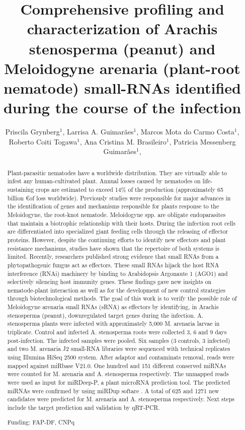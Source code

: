 \documentclass[twoside]{article}
\title{\vspace{-15mm}\fontsize{24pt}{10pt}\selectfont\textbf{ Comprehensive profiling and characterization of  Arachis stenosperma (peanut) and Meloidogyne arenaria (plant-root nematode) small-RNAs identified during the course of the infection }} %
\author{ Priscila Grynberg$^{1}$, Larrisa A. Guimarães$^{1}$, Marcos Mota do Carmo Costa$^{1}$, Roberto Coiti Togawa$^{1}$, Ana Cristina M. Brasileiro$^{1}$, Patricia Messenberg Guimarães$^{1}$, }
\affil{ 1 Embrapa Recursos Genéticos e Biotecnologia

 }
\date{}
\begin{document}
  
  
  \maketitle %
  
  
  \thispagestyle{fancy} %
  
  
  \begin{abstract}
  Plant-parasitic nematodes have a worldwide distribution. They are virtually able to infest any human-cultivated plant. Annual losses caused by nematodes on life-sustaining crops are estimated to exceed 14\% of the production (approximately 65 billion \euro of loss worldwide). Previously studies were responsible for major advances in the identification of genes and mechanisms responsible for plants response to the Meloidogyne, the root-knot nematode. Meloidogyne spp. are obligate endoparasites that maintain a biotrophic relationship with their hosts. During the infection root cells are differentiated into specialized giant feeding cells through the releasing of effector proteins. However, despite the continuing efforts to identify new effectors and plant resistance mechanisms, studies have shown that the repertoire of both systems is limited. Recently, researchers published strong evidence that small RNAs from a phytopathogenic fungus act as effectors. These small RNAs hijack the host RNA interference (RNAi) machinery by binding to Arabidopsis Argonaute 1 (AGO1) and selectively silencing host immunity genes. These findings gave new insights on nematode-plant interaction as well as for the development of new control strategies through biotechnological methods. The goal of this work is to verify the possible role of Meloidogyne arenaria small RNAs (sRNA) as effectors by identifying, in Arachis stenosperma (peanut), downregulated target genes during the infection. A. stenosperma plants were infected with approximately 5,000 M. arenaria larvae in triplicate. Control and infected A. stenosperma roots were collected 3, 6 and 9 days post-infection. The infected samples were pooled. Six samples (3 controls, 3 infected) and two M. arenaria J2 small-RNA libraries were sequenced with technical replicates using Illumina HiSeq 2500 system. After adaptor and contaminats removal, reads were mapped against miRbase V21.0.  One hundred and 151 different conserved miRNAs were counted for M. arenaria and A. stenosperma respectively. The unmapped reads were used as input for miRDeep-P,  a plant microRNA prediction tool. The predicted miRNAs were confirmed by using miRDup softare . A total of 625 and 1271 new candidates were predicted for  M. arenaria and A. stenosperma respectively. Next steps include the target prediction and validation by qRT-PCR.
  
  Funding: FAP-DF, CNPq \\ 
  \end{abstract}
  
\end{document}
